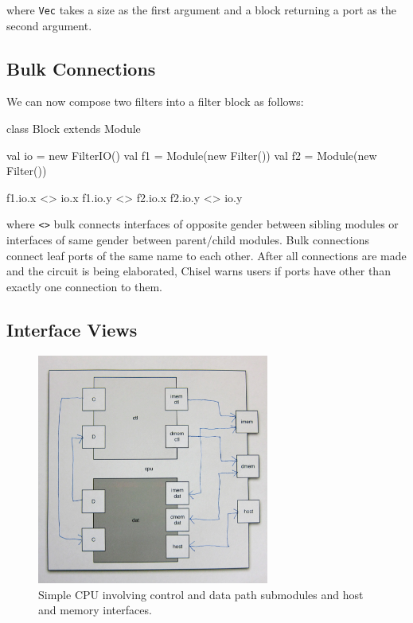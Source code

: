\documentclass[twocolumn,10pt]{article}
\begin{document}

\noindent
where \verb+Vec+ takes a size as the first argument and a block returning a port as the second argument.

\subsection{Bulk Connections}

We can now compose two filters into a filter block as follows:

\begin{scala}
class Block extends Module { 
  val io = new FilterIO()
  val f1 = Module(new Filter())
  val f2 = Module(new Filter())

  f1.io.x <> io.x
  f1.io.y <> f2.io.x
  f2.io.y <> io.y
}
\end{scala}

\noindent
where \verb+<>+ bulk connects interfaces of opposite gender between
sibling modules or interfaces of same gender between parent/child modules. 
Bulk connections connect leaf ports of the same name to each other.
After all connections are made and the circuit is being elaborated,
Chisel warns users if ports have other than exactly one connection to them.

\subsection{Interface Views}

\begin{figure}
\centerline{\includegraphics[width=3in]{figs/cpu.png}}
\caption{Simple CPU involving control and data path submodules and host and memory interfaces.}
\label{fig:cpu}
\end{figure}
\end{document}
